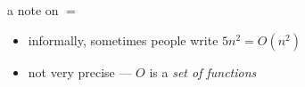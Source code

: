 \begin{frame}{a note on $=$}
    \begin{itemize}
    \item informally, sometimes people write $5n^2 = O(n^2)$
    \item not very precise --- $O$ is a \textit{set of functions}
    \end{itemize}
\end{frame}
